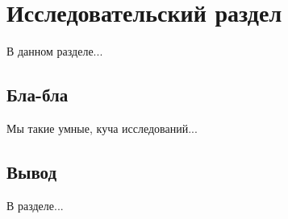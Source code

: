 \section{Исследовательский раздел} 
В данном разделе...

\subsection{Бла-бла}
Мы такие умные, куча исследований...

\subsection*{Вывод}
В разделе...
